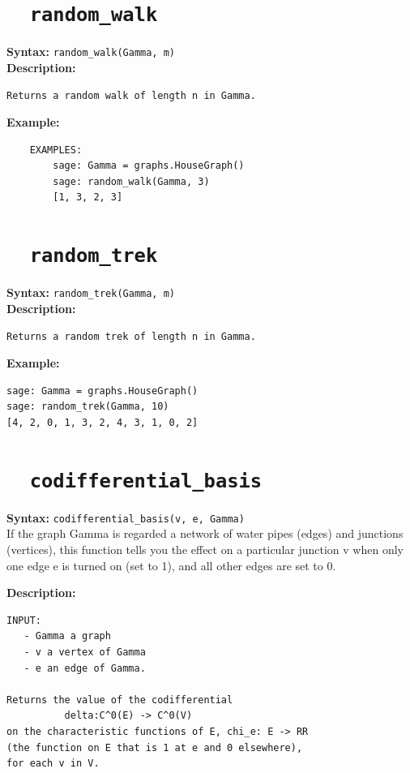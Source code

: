 \documentclass{article}
\begin{document}
\section{\tt \ \ random\_walk}

\textbf{Syntax:} \verb}random_walk(Gamma, m)}\\

\textbf{Description:}
\begin{verbatim}
Returns a random walk of length n in Gamma.
\end{verbatim}

\textbf{Example:}
\begin{verbatim}
    EXAMPLES:
        sage: Gamma = graphs.HouseGraph()
        sage: random_walk(Gamma, 3)
        [1, 3, 2, 3]
\end{verbatim}

\section{\tt \ \ random\_trek}

\textbf{Syntax:} \verb}random_trek(Gamma, m)}\\

\textbf{Description:}
\begin{verbatim}
Returns a random trek of length n in Gamma.
\end{verbatim}

\textbf{Example:}
\begin{verbatim}
sage: Gamma = graphs.HouseGraph()
sage: random_trek(Gamma, 10)
[4, 2, 0, 1, 3, 2, 4, 3, 1, 0, 2]

\end{verbatim}

\section{\tt \ \ codifferential\_basis}

\textbf{Syntax:} \verb}codifferential_basis(v, e, Gamma)}\\

If the graph Gamma is regarded a network of water pipes (edges) and junctions (vertices),
this function tells you the effect on a particular junction v when only one edge e is
turned on (set to 1), and all other edges are set to 0.

\textbf{Description:}
\begin{verbatim}
INPUT: 
   - Gamma a graph
   - v a vertex of Gamma
   - e an edge of Gamma.

Returns the value of the codifferential
          delta:C^0(E) -> C^0(V)
on the characteristic functions of E, chi_e: E -> RR  
(the function on E that is 1 at e and 0 elsewhere), 
for each v in V.
\end{verbatim}
\end{document}
